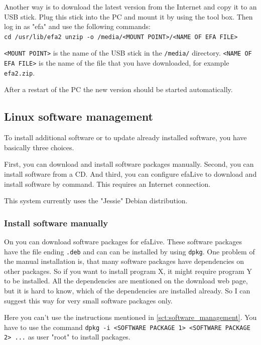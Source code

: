 \documentclass[a4paper,12pt,twoside]{article}
\begin{document}
Another way is to download the latest version from the Internet
\cite{EFA1} and copy it to an USB stick. Plug this stick into the PC
and mount it by using the tool box. Then log in as
"efa" and use the following commands:
\bigskip
\\
\texttt{cd /usr/lib/efa2
unzip -o /media/{\textless}MOUNT POINT{\textgreater}/{\textless}NAME OF
EFA FILE{\textgreater}}

\bigskip
\texttt{{\textless}MOUNT POINT{\textgreater}} is the name of the USB stick in the
\texttt{/media/} directory. \texttt{{\textless}NAME OF EFA FILE{\textgreater}} is the
name of the file that you have downloaded, for example
\texttt{efa2.zip}.

After a restart of the PC the new version should be started
automatically.


\subsection{Linux software management}
\label{sct:linux_software}
To install additional software or to update already installed software,
you have basically three choices.

First, you can download and install software packages manually. Second,
you can install software from a CD. And third, you can configure
efaLive to download and install software by command. This requires an
Internet connection.

This system currently uses the "Jessie" Debian distribution.


\subsubsection{Install software manually}
\label{sct:software_manually}
On \cite{DEB3} you can download software packages for efaLive. These
software packages have the file ending
\texttt{.deb} and can can be installed by using
\texttt{dpkg}. One problem of the manual
installation is, that many software packages have dependencies on other
packages. So if you want to install program X, it might require program
Y to be installed. All the dependencies are mentioned on the download
web page, but it is hard to know, which of the dependencies are
installed already. So I can suggest this way for very small software
packages only.

Here you can't use the instructions mentioned in \ref{sct:software_management}.
You have to use the command \texttt{dpkg -i {\textless}SOFTWARE
PACKAGE 1{\textgreater} {\textless}SOFTWARE PACKAGE 2{\textgreater}
...} as user "root" to install packages.
\end{document}

